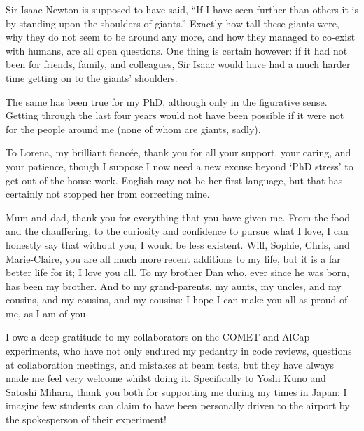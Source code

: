 \begin{acknowledgements}
Sir Isaac Newton is supposed to have said, ``If I have seen further than others it is by standing upon the shoulders of giants.''  
Exactly how tall these giants were, why they do not seem to be around any more, and how they managed to co-exist with humans, are all open questions.
One thing is certain however: if it had not been for friends, family, and colleagues, Sir Isaac would have had a much harder time getting on to the giants' shoulders.

The same has been true for my PhD, although only in the figurative sense.
Getting through the last four years would not have been possible if it were not for the people around me (none of whom are giants, sadly).

To Lorena, my brilliant fianc\'{e}e, thank you for all your support, your caring, and your patience, though I suppose I now need a new excuse beyond `PhD stress' to get out of the house work.
English may not be her first language, but that has certainly not stopped her from correcting mine.

Mum and dad, thank you for everything that you have given me. From the food and the chauffering, to the curiosity and confidence to pursue what I love, 
I can honestly say that without you, I would be less existent.
Will, Sophie, Chris, and Marie-Claire, you are all much more recent additions to my life, but it is a far better life for it; I love you all.
To my brother Dan who, ever since he was born, has been my brother.
And to my grand-parents, my aunts, my uncles, and my cousins, and my cousins, and my cousins:  I hope I can make you all as proud of me, as I am of you.

I owe a deep gratitude to my collaborators on the COMET and AlCap experiments, who have not only endured my pedantry in code reviews, questions at collaboration meetings, and mistakes at beam tests, but they have always made me feel very welcome whilst doing it. 
Specifically to Yoshi Kuno and Satoshi Mihara, thank you both for supporting me during my times in Japan:
I imagine few students can claim to have been personally driven to the airport by the spokesperson of their experiment!


\end{acknowledgements}
